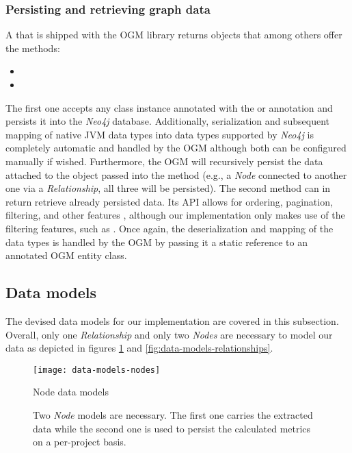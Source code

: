 \documentclass[12pt,a4paper]{report}
\begin{document}
\subsubsection{Persisting and retrieving graph data}
A 
that is shipped with the OGM library returns  objects that among
others offer the methods:
\begin{itemize}[noitemsep]
    \item {}
    \item {}
\end{itemize}
The first one accepts any class instance
annotated with the  or  annotation
and persists it into the \textit{Neo4j} database. Additionally, serialization
and subsequent mapping of native JVM data types into data types supported by
\textit{Neo4j} is completely automatic and handled by the OGM \cite{neo4j-ogm}
although both can be configured manually if wished. Furthermore, the OGM will
recursively persist the data attached to the object passed into the  method (e.g., a \textit{Node} connected to another one via a
\textit{Relationship}, all three will be persisted). The second method can
in return retrieve already persisted data. Its API allows for ordering, pagination,
filtering, and other features \cite{neo4j-ogm}, although our implementation
only makes use of the filtering features, such as
.
Once again, the deserialization and mapping of the data types is handled
by the OGM by passing it a static reference to an annotated OGM entity class.


\subsection{Data models} \label{subsect:data-models}

The devised data models for our implementation are covered in this
subsection. Overall, only one \textit{Relationship} and only two \textit{Nodes}
are necessary to model our data as depicted in figures
\ref{fig:data-models-nodes} and \ref{fig:data-models-relationships}.

\begin{figure}[htbp]
\centering
\texttt{[image: data-models-nodes]}
\caption{Node data models}
\caption*{\centering
  Two \textit{Node} models are necessary. The first one carries the extracted
  data while the second one is used to persist the calculated metrics on a
  per\hyp project basis.
}
\label{fig:data-models-nodes}
\end{figure}
\end{document}
